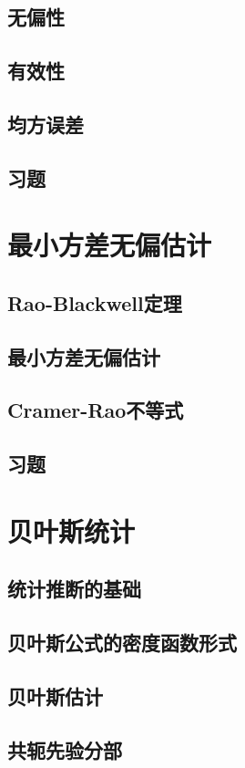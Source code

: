 \subsection{无偏性}
\subsection{有效性}
\subsection{均方误差}
\subsection{习题}

\section{最小方差无偏估计}
\subsection{Rao-Blackwell定理}
\subsection{最小方差无偏估计}
\subsection{Cramer-Rao不等式}
\subsection{习题}

\section{贝叶斯统计}
\subsection{统计推断的基础}
\subsection{贝叶斯公式的密度函数形式}
\subsection{贝叶斯估计}
\subsection{共轭先验分部}
